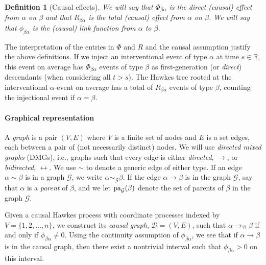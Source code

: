 \documentclass[accepted]{uai2021} %
\newtheorem{defn}[thm]{Definition}
\newcommand{\pa}{\textnormal{pa}}
\begin{document}
\begin{defn}[Causal effects]
	We will say that $\Phi_{\beta\alpha}$ is the \emph{direct (causal) effect} 
	from 
	$\alpha$ on $\beta$ and that $R_{\beta\alpha}$ is the \emph{total (causal) 
	effect} from $\alpha$ on $\beta$. We will say that $\phi_{\beta\alpha}$ is 
	the 
	{\it (causal) link function} from $\alpha$ to $\beta$.
	\label{def:cauEff}
\end{defn}

The interpretation of the entries in $\Phi$ and $R$ and the causal assumption 
justify the above definitions. If 
we inject an 
interventional event of type $\alpha$ at time $s \in \mathbb{R}$, this 
event on average has $\Phi_{\beta\alpha}$ events 
of type $\beta$ as first-generation (or \emph{direct}) descendants (when 
considering all $t > s$). The Hawkes tree rooted at the 
interventional $\alpha$-event on average has a total of $R_{\beta\alpha}$ 
events of 
type $\beta$, counting the injectional event if $\alpha=\beta$. 


\paragraph{Graphical representation}

A {\it graph} is a pair $(V,E)$ where $V$ is a finite set of nodes and $E$ is a 
set edges, each between a pair of (not necessarily distinct) nodes. We will  
use {\it directed mixed graphs} (DMGs), i.e., graphs such that every edge 
is 
either \emph{directed}, $\rightarrow$, or \emph{bidirected}, $\leftrightarrow$. 
We use $\sim$ to denote a generic edge of either type. If an edge $\alpha \sim 
\beta$ is in a graph $\mathcal{G}$, we write $\alpha \sim_\mathcal{G} \beta$. 
If the edge 
$\alpha\rightarrow\beta$ is in the graph $\mathcal{G}$, say that $\alpha$ is 
a \emph{parent} of $\beta$, and we let $\pa_\mathcal{G}(\beta)$ denote the set 
of parents 
of $\beta$ in the graph $\mathcal{G}$.

Given a causal Hawkes process with coordinate processes indexed by $V = 
\{1,2,\ldots,n\}$, we construct its \emph{causal graph}, $\mathcal{D} = (V,E)$, 
such that 
$\alpha \rightarrow_\mathcal{D} \beta$ if and only if $\phi_{\beta\alpha} \neq 
0$. 
Using the continuity assumption of $\phi_{\beta\alpha}$, we see 
that if $\alpha\rightarrow\beta$ is in the causal graph, then there exist a 
nontrivial interval such 
that $\phi_{\beta\alpha} > 0$ on this interval.
\end{document}
